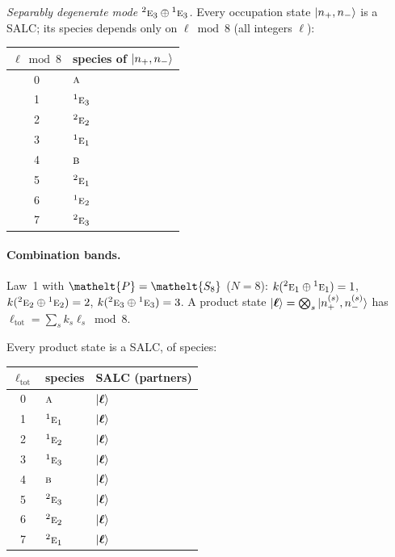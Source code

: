 \documentclass[11pt]{article}
\newcommand{\eltfont}[1]{{\let\sigma\eltsigma\mathelt{#1}}}
\newcommand{\irr}[1]{\text{\normalfont\scshape #1}}
\newcommand{\conjpair}[1]{{}^{#1}}
\newcommand{\elt}[1]{\eltfont{#1}}
\newcommand{\pel}{\elt{P}}             %
\begin{document}
\emph{Separably degenerate mode $\conjpair{2}\irr{e}_{3}\oplus \conjpair{1}\irr{e}_{3}$.} Every occupation state $\ket{n_+,n_-}$ is a SALC; its species depends only on $\ell\bmod 8$ (all integers $\ell$):
\begin{longtable}{c l}\hline $\ell\bmod 8$ & species of $\ket{n_+,n_-}$\\ \hline\endhead
0 & $\irr{a}$\\
1 & $\conjpair{1}\irr{e}_{3}$\\
2 & $\conjpair{2}\irr{e}_{2}$\\
3 & $\conjpair{1}\irr{e}_{1}$\\
4 & $\irr{b}$\\
5 & $\conjpair{2}\irr{e}_{1}$\\
6 & $\conjpair{1}\irr{e}_{2}$\\
7 & $\conjpair{2}\irr{e}_{3}$\\
\hline\end{longtable}

\paragraph{Combination bands.}

Law~1 with $\pel=\elt{S_{8}}$ ($N=8$): $k(\conjpair{2}\irr{e}_{1}\oplus \conjpair{1}\irr{e}_{1})=1$, $k(\conjpair{2}\irr{e}_{2}\oplus \conjpair{1}\irr{e}_{2})=2$, $k(\conjpair{2}\irr{e}_{3}\oplus \conjpair{1}\irr{e}_{3})=3$. A product state $\ket{\boldsymbol\ell}=\bigotimes_s\ket{n_+^{(s)},n_-^{(s)}}$ has $\ell_{\mathrm{tot}}=\sum_sk_s\ell_s\bmod 8$.

Every product state is a SALC, of species:

\begin{longtable}{c l l}\hline $\ell_{\mathrm{tot}}$ & species & SALC (partners)\\ \hline\endhead

0 & $\irr{a}$ & $\ket{\boldsymbol\ell}$\\

1 & $\conjpair{1}\irr{e}_{1}$ & $\ket{\boldsymbol\ell}$\\

2 & $\conjpair{1}\irr{e}_{2}$ & $\ket{\boldsymbol\ell}$\\

3 & $\conjpair{1}\irr{e}_{3}$ & $\ket{\boldsymbol\ell}$\\

4 & $\irr{b}$ & $\ket{\boldsymbol\ell}$\\

5 & $\conjpair{2}\irr{e}_{3}$ & $\ket{\boldsymbol\ell}$\\

6 & $\conjpair{2}\irr{e}_{2}$ & $\ket{\boldsymbol\ell}$\\

7 & $\conjpair{2}\irr{e}_{1}$ & $\ket{\boldsymbol\ell}$\\

\hline\end{longtable}
\end{document}
